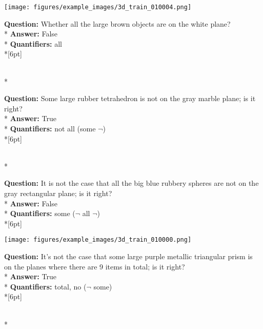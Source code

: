 \begin{figure*}
\begin{minipage}{0.48\textwidth}
    \texttt{[image: figures/example\_images/3d\_train\_010004.png]}
    \begin{minipage}[t][2.2cm][t]{1\textwidth}
      \footnotesize
      \textbf{Question:} Whether all the large brown objects are on the white plane? \\*
      \textbf{Answer:} False \\*
      \textbf{Quantifiers:} all  \\*[6pt]
    \end{minipage}\\*
    \begin{minipage}[t][2.2cm][t]{1\textwidth}
      \footnotesize
      \textbf{Question:} Some large rubber tetrahedron is not on the gray marble plane; is it right? \\*
      \textbf{Answer:} True \\*
      \textbf{Quantifiers:} not all (some $\neg$)  \\*[6pt]
    \end{minipage}\\*
    \begin{minipage}[t][2.2cm][t]{1\textwidth}
      \footnotesize
      \textbf{Question:} It is not the case that all the big blue rubbery spheres are not on the gray rectangular plane; is it right? \\*
      \textbf{Answer:} False \\*
      \textbf{Quantifiers:} some ($\neg$ all $\neg$) \\*[6pt]
    \end{minipage}
  \end{minipage}
  \hspace{3.5mm}
  \begin{minipage}{0.48\textwidth}
    \texttt{[image: figures/example\_images/3d\_train\_010000.png]}
    \begin{minipage}[t][2.2cm][t]{1\textwidth}
      \footnotesize
      \textbf{Question:} It's not the case that some large purple metallic triangular prism is on the planes where there are 9 items in total; is it right? \\*
      \textbf{Answer:} True \\*
      \textbf{Quantifiers:} total, no ($\neg$ some)  \\*[6pt]
    \end{minipage}\\*

\end{minipage}
\end{figure*}
